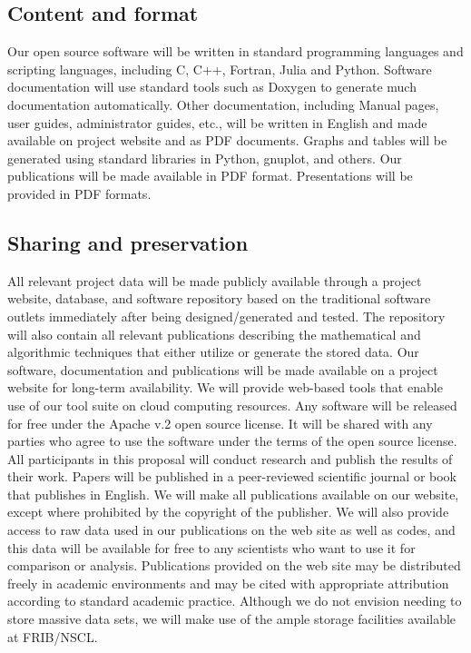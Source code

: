 \documentclass[10pt]{article}
\begin{document}
\subsection{Content and format}
Our open source software will be written in standard programming languages and scripting languages,
including C, C++, Fortran, Julia and Python. Software documentation will use standard
tools such as Doxygen to generate much documentation automatically. Other
documentation, including Manual pages, user guides, administrator guides, etc., will be written in
English and made available on project website and as PDF documents. Graphs and tables will be
generated using standard libraries in Python, gnuplot, and others. Our publications will be made
available in PDF format. Presentations will be provided in PDF formats.
\subsection{Sharing and preservation}
All relevant project data will be made publicly available through a project website, database,
and software repository based on the traditional software outlets immediately after being designed/generated and tested. The repository will also contain all relevant publications describing
the mathematical and algorithmic techniques that either utilize or generate the stored data. Our
software, documentation and publications will be made available on a project website for long-term
availability. We will provide web-based tools that enable use of our tool suite on cloud computing
resources. Any software will be released for
free under the Apache v.2 open source license. It will be shared with any parties who agree to
use the software under the terms of the open source license. All participants in this proposal will
conduct research and publish the results of their work. Papers will be published in a peer-reviewed
scientific journal or book that publishes in English. We will
make all publications available on our website, except where prohibited by the copyright of the
publisher. We will also provide access to raw data used in our publications on the web site as well as codes, and
this data will be available for free to any scientists who want to use it for comparison or analysis.
Publications provided on the web site may be distributed freely in academic environments and
may be cited with appropriate attribution according to standard academic practice. Although we
do not envision needing to store massive data sets, we will make use of the ample storage facilities
available at FRIB/NSCL.
\end{document}

